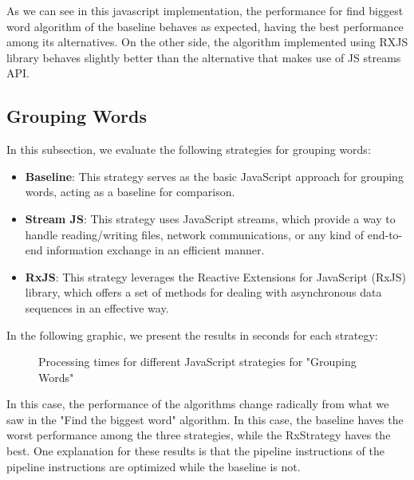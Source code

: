 As we can see in this javascript implementation, the performance for find biggest word algorithm of the baseline behaves as expected, having the best performance among its alternatives. On the other side, the algorithm implemented using RXJS library behaves slightly better than the alternative that makes use of JS streams API.


\clearpage



\subsection{Grouping Words}
\label{subsec:grouping_words_js}

In this subsection, we evaluate the following strategies for grouping words:

\begin{itemize}
    \item \textbf{Baseline}: This strategy serves as the basic JavaScript approach for grouping words, acting as a baseline for comparison.
    \item \textbf{Stream JS}: This strategy uses JavaScript streams, which provide a way to handle reading/writing files, network communications, or any kind of end-to-end information exchange in an efficient manner.
    \item \textbf{RxJS}: This strategy leverages the Reactive Extensions for JavaScript (RxJS) library, which offers a set of methods for dealing with asynchronous data sequences in an effective way.
\end{itemize}

In the following graphic, we present the results in seconds for each strategy:

\begin{figure}[H]
    \centering
    \caption{Processing times for different JavaScript strategies for "Grouping Words"}
    \label{fig:grouping_words_processing_times_js}
\end{figure}



In this case, the performance of the algorithms change radically from what we saw in the "Find the biggest word" algorithm. In this case, the baseline haves the worst performance among the three strategies, while the RxStrategy haves the best. 
One explanation for these results is that the pipeline instructions of the pipeline instructions are optimized while the baseline is not. 